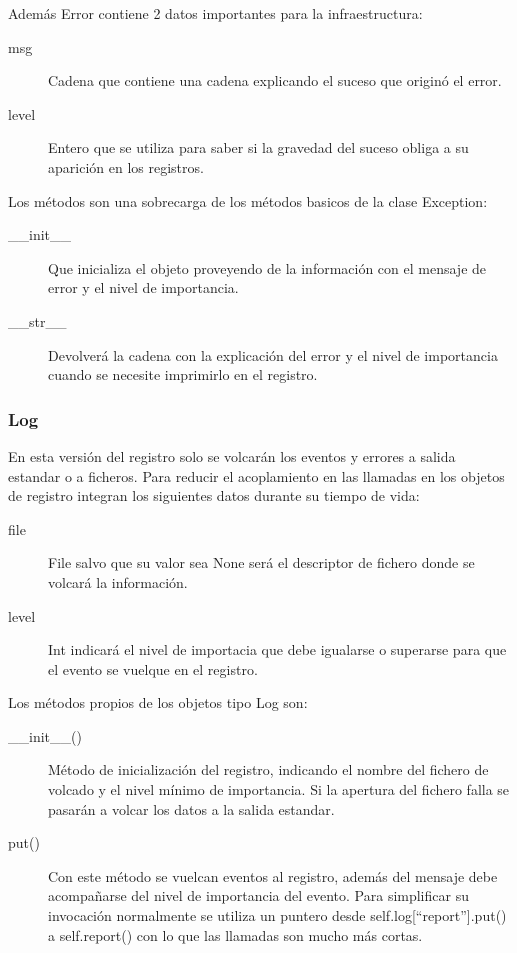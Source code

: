 \documentclass[a4paper,spanish,12pt]{book}
\begin{document}
Además Error contiene 2 datos importantes para la infraestructura:
\begin{description}
	\item[msg]Cadena que contiene una cadena explicando el suceso que originó el error.
	\item[level]Entero que se utiliza para saber si la gravedad del suceso obliga a su aparición en los registros.
\end{description}
Los m\'etodos son una sobrecarga de los m\'etodos basicos de la clase Exception:
\begin{description}
	\item[\_\_init\_\_]Que inicializa el objeto proveyendo de la información con el mensaje de error y el nivel de importancia.
	\item[\_\_str\_\_]Devolverá la cadena con la explicación del error y el nivel de importancia cuando se necesite imprimirlo en el registro.
\end{description}
\subsubsection{Log}
En esta versión del registro solo se volcarán los eventos y errores a salida estandar o a ficheros. Para reducir el acoplamiento en las llamadas en los objetos de registro integran los siguientes datos durante su tiempo de vida:
\begin{description}
	\item[file]File salvo que su valor sea None será el descriptor de fichero donde se volcará la información.
	\item[level]Int indicará el nivel de importacia que debe igualarse o superarse para que el evento se vuelque en el registro.
\end{description}
Los m\'etodos propios de los objetos tipo Log son:
\begin{description}
	\item[\_\_init\_\_()]M\'etodo de inicialización del registro, indicando el nombre del fichero de volcado y el nivel mínimo de importancia. Si la apertura del fichero falla se pasarán a volcar los datos a la salida estandar.
	\item[put()]Con este m\'etodo se vuelcan eventos al registro, además del mensaje debe acompañarse del nivel de importancia del evento. Para simplificar su invocación normalmente se utiliza un puntero desde self.log[``report''].put() a self.report() con lo que las llamadas son mucho más cortas.
\end{description}
\end{document}
